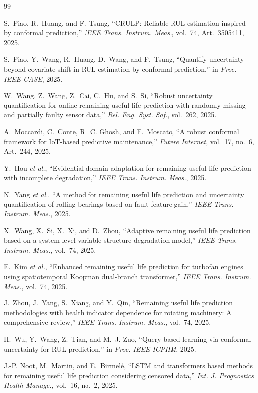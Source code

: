 \documentclass[journal]{IEEEtran}
\begin{document}
\begin{thebibliography}{99}

S.~Piao, R.~Huang, and F.~Tsung, ``CRULP: Reliable RUL estimation inspired by conformal
prediction,'' \emph{IEEE Trans. Instrum. Meas.}, vol.~74, Art.~3505411, 2025.

S.~Piao, Y.~Wang, R.~Huang, D.~Wang, and F.~Tsung, ``Quantify uncertainty beyond covariate
shift in RUL estimation by conformal prediction,'' in \emph{Proc. IEEE CASE}, 2025.

W.~Wang, Z.~Wang, Z.~Cai, C.~Hu, and S.~Si, ``Robust uncertainty quantification for online
remaining useful life prediction with randomly missing and partially faulty sensor data,''
\emph{Rel. Eng. Syst. Saf.}, vol.~262, 2025.

A.~Moccardi, C.~Conte, R.~C. Ghosh, and F.~Moscato, ``A robust conformal framework for
IoT-based predictive maintenance,'' \emph{Future Internet}, vol.~17, no.~6, Art.~244, 2025.

Y.~Hou \emph{et al.}, ``Evidential domain adaptation for remaining useful life prediction with
incomplete degradation,'' \emph{IEEE Trans. Instrum. Meas.}, 2025.

N.~Yang \emph{et al.}, ``A method for remaining useful life prediction and uncertainty
quantification of rolling bearings based on fault feature gain,'' \emph{IEEE Trans. Instrum.
Meas.}, 2025.

X.~Wang, X.~Si, X.~Xi, and D.~Zhou, ``Adaptive remaining useful life prediction based on a
system-level variable structure degradation model,'' \emph{IEEE Trans. Instrum. Meas.},
vol.~74, 2025.

E.~Kim \emph{et al.}, ``Enhanced remaining useful life prediction for turbofan engines using
spatiotemporal Koopman dual-branch transformer,'' \emph{IEEE Trans. Instrum. Meas.}, vol.~74,
2025.

J.~Zhou, J.~Yang, S.~Xiang, and Y.~Qin, ``Remaining useful life prediction methodologies with
health indicator dependence for rotating machinery: A comprehensive review,'' \emph{IEEE
Trans. Instrum. Meas.}, vol.~74, 2025.

H.~Wu, Y.~Wang, Z.~Tian, and M.~J. Zuo, ``Query based learning via conformal uncertainty for
RUL prediction,'' in \emph{Proc. IEEE ICPHM}, 2025.

J.-P. Noot, M.~Martin, and E.~Birmel\'e, ``LSTM and transformers based methods for remaining
useful life prediction considering censored data,'' \emph{Int. J. Prognostics Health Manage.},
vol.~16, no.~2, 2025.


\end{thebibliography}
\end{document}
